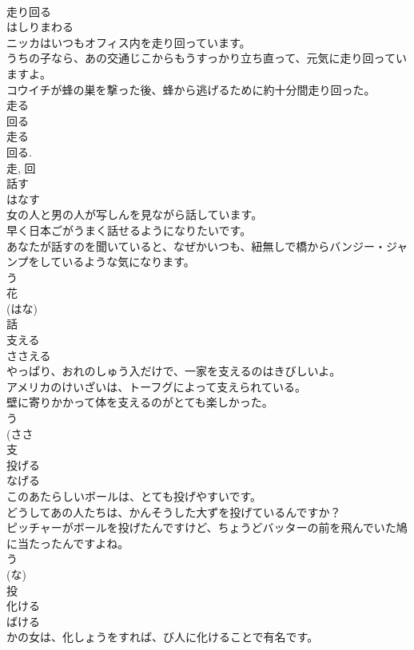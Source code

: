 \documentclass[8pt]{extreport}
\begin{document}
\begin{CJK}{UTF8}{min}
\\	走り回る	
\\	はしりまわる	
\\	ニッカはいつもオフィス内を走り回っています。	
\\	うちの子なら、あの交通じこからもうすっかり立ち直って、元気に走り回っていますよ。	
\\	コウイチが蜂の巣を撃った後、蜂から逃げるために約十分間走り回った。	
\\	走る 
\\	回る 
\\	走る 
\\	回る. 
\\	走, 回	
\\	話す	
\\	はなす	
\\	女の人と男の人が写しんを見ながら話しています。	
\\	早く日本ごがうまく話せるようになりたいです。	
\\	あなたが話すのを聞いていると、なぜかいつも、紐無しで橋からバンジー・ジャンプをしているような気になります。	
\\	う 
\\	花
\\	(はな) 
\\	話	
\\	支える	
\\	ささえる	
\\	やっぱり、おれのしゅう入だけで、一家を支えるのはきびしいよ。	
\\	アメリカのけいざいは、トーフグによって支えられている。	
\\	壁に寄りかかって体を支えるのがとても楽しかった。	
\\	う 
\\	(ささ 
\\	支	
\\	投げる	
\\	なげる	
\\	このあたらしいボールは、とても投げやすいです。	
\\	どうしてあの人たちは、かんそうした大ずを投げているんですか？	
\\	ピッチャーがボールを投げたんですけど、ちょうどバッターの前を飛んでいた鳩に当たったんですよね。	
\\	う 
\\	(な) 
\\	投	
\\	化ける	
\\	ばける	
\\	かの女は、化しょうをすれば、び人に化けることで有名です。	

\end{CJK}
\end{document}
